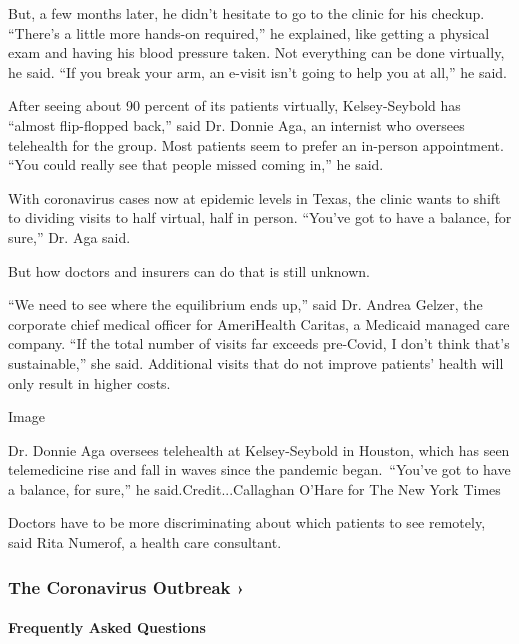 But, a few months later, he didn't hesitate to go to the clinic for his
checkup. ``There's a little more hands-on required,'' he explained, like
getting a physical exam and having his blood pressure taken. Not
everything can be done virtually, he said. ``If you break your arm, an
e-visit isn't going to help you at all,'' he said.

After seeing about 90 percent of its patients virtually, Kelsey-Seybold
has ``almost flip-flopped back,'' said Dr. Donnie Aga, an internist who
oversees telehealth for the group. Most patients seem to prefer an
in-person appointment. ``You could really see that people missed coming
in,'' he said.

With coronavirus cases now at epidemic levels in Texas, the clinic wants
to shift to dividing visits to half virtual, half in person. ``You've
got to have a balance, for sure,'' Dr. Aga said.

But how doctors and insurers can do that is still unknown.

``We need to see where the equilibrium ends up,'' said Dr. Andrea
Gelzer, the corporate chief medical officer for AmeriHealth Caritas, a
Medicaid managed care company. ``If the total number of visits far
exceeds pre-Covid, I don't think that's sustainable,'' she said.
Additional visits that do not improve patients' health will only result
in higher costs.

Image

Dr. Donnie Aga oversees telehealth at Kelsey-Seybold in Houston, which
has seen telemedicine rise and fall in waves since the pandemic
began.~``You've got to have a balance, for sure,'' he
said.Credit...Callaghan O'Hare for The New York Times

Doctors have to be more discriminating about which patients to see
remotely, said Rita Numerof, a health care consultant.

\href{https://www.nytimes.com/news-event/coronavirus?action=click\&pgtype=Article\&state=default\&region=MAIN_CONTENT_3\&context=storylines_faq}{}

\hypertarget{the-coronavirus-outbreak-}{%
\subsubsection{The Coronavirus Outbreak
›}\label{the-coronavirus-outbreak-}}

\hypertarget{frequently-asked-questions}{%
\paragraph{Frequently Asked
Questions}\label{frequently-asked-questions}}


